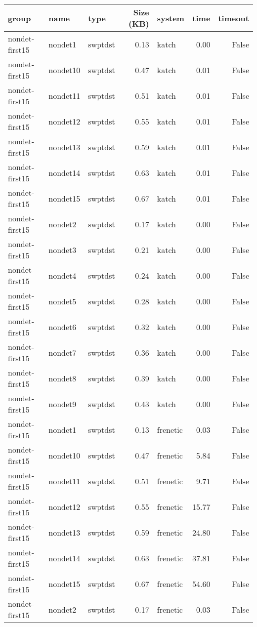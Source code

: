 \begin{tabular}{lllrlrr}
\toprule
group & name & type & Size (KB) & system & time & timeout \\
\midrule
nondet-first15 & nondet1 & swptdst & 0.13 & katch & 0.00 & False \\
nondet-first15 & nondet10 & swptdst & 0.47 & katch & 0.01 & False \\
nondet-first15 & nondet11 & swptdst & 0.51 & katch & 0.01 & False \\
nondet-first15 & nondet12 & swptdst & 0.55 & katch & 0.01 & False \\
nondet-first15 & nondet13 & swptdst & 0.59 & katch & 0.01 & False \\
nondet-first15 & nondet14 & swptdst & 0.63 & katch & 0.01 & False \\
nondet-first15 & nondet15 & swptdst & 0.67 & katch & 0.01 & False \\
nondet-first15 & nondet2 & swptdst & 0.17 & katch & 0.00 & False \\
nondet-first15 & nondet3 & swptdst & 0.21 & katch & 0.00 & False \\
nondet-first15 & nondet4 & swptdst & 0.24 & katch & 0.00 & False \\
nondet-first15 & nondet5 & swptdst & 0.28 & katch & 0.00 & False \\
nondet-first15 & nondet6 & swptdst & 0.32 & katch & 0.00 & False \\
nondet-first15 & nondet7 & swptdst & 0.36 & katch & 0.00 & False \\
nondet-first15 & nondet8 & swptdst & 0.39 & katch & 0.00 & False \\
nondet-first15 & nondet9 & swptdst & 0.43 & katch & 0.00 & False \\
nondet-first15 & nondet1 & swptdst & 0.13 & frenetic & 0.03 & False \\
nondet-first15 & nondet10 & swptdst & 0.47 & frenetic & 5.84 & False \\
nondet-first15 & nondet11 & swptdst & 0.51 & frenetic & 9.71 & False \\
nondet-first15 & nondet12 & swptdst & 0.55 & frenetic & 15.77 & False \\
nondet-first15 & nondet13 & swptdst & 0.59 & frenetic & 24.80 & False \\
nondet-first15 & nondet14 & swptdst & 0.63 & frenetic & 37.81 & False \\
nondet-first15 & nondet15 & swptdst & 0.67 & frenetic & 54.60 & False \\
nondet-first15 & nondet2 & swptdst & 0.17 & frenetic & 0.03 & False \\

\end{tabular}
